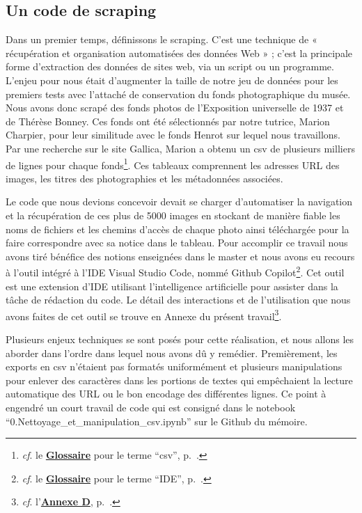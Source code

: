 \subsection{Un code de scraping}

Dans un premier temps, définissons le scraping. C'est une technique de « récupération et organisation automatisées des données Web » ; c'est la principale forme d'extraction des données de sites web, via un script ou un programme. L'enjeu pour nous était d'augmenter la taille de notre jeu de données pour les premiers tests avec l'attaché de conservation du fonds photographique du musée. Nous avons donc scrapé des fonds photos de l'Exposition universelle de 1937 et de Thérèse Bonney. Ces fonds ont été sélectionnés par notre tutrice, Marion Charpier, pour leur similitude avec le fonds Henrot sur lequel nous travaillons. Par une recherche sur le site Gallica, Marion a obtenu un csv de plusieurs milliers de lignes pour chaque fonds\footnote{\textit{cf}. le \textbf{\hyperref[sec:Glossaire]{Glossaire}} pour le terme \enquote{csv}, p.~\pageref{sec:Glossaire}.}. Ces tableaux comprennent les adresses URL des images, les titres des photographies et les métadonnées associées. 

Le code que nous devions concevoir devait se charger d'automatiser la navigation et la récupération de ces plus de 5000 images en stockant de manière fiable les noms de fichiers et les chemins d'accès de chaque photo ainsi téléchargée pour la faire correspondre avec sa notice dans le tableau. Pour accomplir ce travail nous avons tiré bénéfice des notions enseignées dans le master et nous avons eu recours à l'outil intégré à l'IDE Visual Studio Code, nommé Github Copilot\footnote{\textit{cf}. le \textbf{\hyperref[sec:Glossaire]{Glossaire}} pour le terme \enquote{IDE}, p.~\pageref{sec:Glossaire}.}. Cet outil est une extension d'IDE utilisant l'intelligence artificielle pour assister dans la tâche de rédaction du code. Le détail des interactions et de l'utilisation que nous avons faites de cet outil se trouve en Annexe du présent travail\footnote{\textit{cf}. l'\textbf{\hyperref[sec:Copilot]{Annexe D}}, p.~\pageref{sec:Copilot}.}.

Plusieurs enjeux techniques se sont posés pour cette réalisation, et nous allons les aborder dans l'ordre dans lequel nous avons dû y remédier. Premièrement, les exports en csv n'étaient pas formatés uniformément et plusieurs manipulations pour enlever des caractères dans les portions de textes qui empêchaient la lecture automatique des URL ou le bon encodage des différentes lignes. Ce point à engendré un court travail de code qui est consigné dans le notebook \enquote{0.Nettoyage\_et\_manipulation\_csv.ipynb} sur le Github du mémoire.

